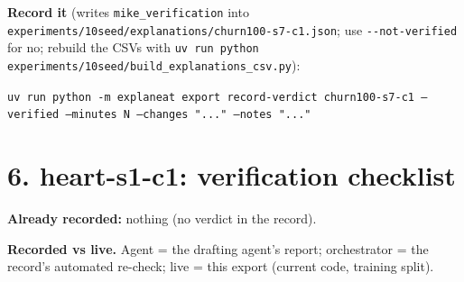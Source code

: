 \documentclass[a4paper,11pt]{article}
\begin{document}
\textbf{Record it} (writes \texttt{mike\_verification} into \texttt{experiments/10seed/explanations/churn100-s7-c1.json}; use \texttt{-{}-not-verified} for no; rebuild the CSVs with \texttt{uv run python experiments/10seed/build\_explanations\_csv.py}):

{\footnotesize\raggedright\texttt{uv run python -m explaneat export record-verdict churn100-s7-c1 --verified --minutes N --changes "..." --notes "..."}\par}


\clearpage




















\clearpage
\section*{6. heart-s1-c1: verification checklist}
\label{rev:heart-s1-c1}
\textbf{Already recorded:} nothing (no verdict in the record).

\textbf{Recorded vs live.} Agent = the drafting agent's report; orchestrator = the record's automated re-check; live = this export (current code, training split).
\end{document}
